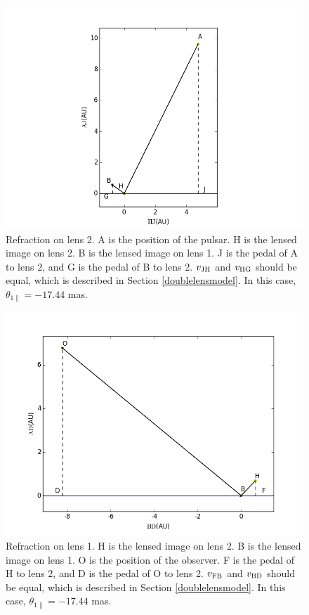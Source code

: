 \documentclass[useAMS,usenatbib]{mn2e}
\begin{document}
\begin{figure}
\centering
\includegraphics[width=1.0\linewidth,scale=1.0]{First_reflection.png}
\caption{Refraction on lens 2. 
A is the position of the pulsar. H is the lensed image on lens 2. B is the lensed image on lens 1. J is the pedal of A to lens 2, and G is the pedal of B to lens 2. $v_{\rm JH}$ and $v_{\rm HG}$ should be equal, which is described in Section \ref{doublelensmodel}. In this case, $\theta_{1\parallel} =-17.44$ mas.}
\label{first_reflect}
\end{figure}

\begin{figure}
\centering
\includegraphics[width=1.0\linewidth]{Second_reflection.png}
\caption{Refraction on lens 1. 
H is the lensed image on lens 2. B is the lensed image on lens 1. O is the position of the observer. F is the pedal of H to lens 2, and D is the pedal of O to lens 2. $v_{\rm FB}$ and $v_{\rm BD}$ should be equal, which is described in Section \ref{doublelensmodel}. In this case, $\theta_{1\parallel} = -17.44$ mas. }
\label{second_reflect}
\end{figure}
\end{document}
